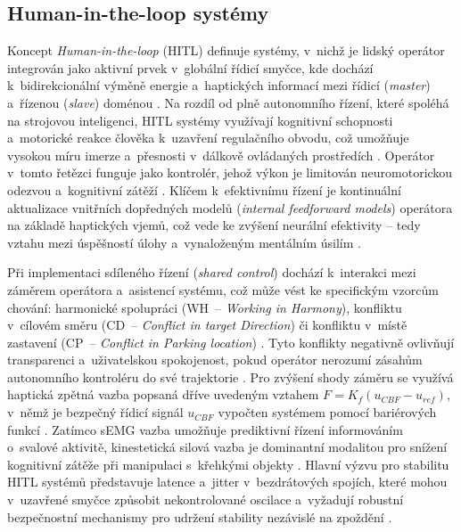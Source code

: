 \documentclass[FZS,DP]{tulthesis}
\begin{document}
\subsection{Human-in-the-loop systémy}
Koncept \textit{Human-in-the-loop} (HITL) definuje systémy, v~nichž je lidský operátor integrován jako aktivní prvek v~globální řídicí smyčce, kde dochází k~bidirekcionální výměně energie a~haptických informací mezi řídicí (\textit{master}) a~řízenou (\textit{slave}) doménou \cite{Aijaz2018, Xiong2024}.
Na rozdíl od plně autonomního řízení, které spoléhá na strojovou inteligenci, HITL systémy využívají kognitivní schopnosti a~motorické reakce člověka k~uzavření regulačního obvodu, což umožňuje vysokou míru imerze a~přesnosti v~dálkově ovládaných prostředích \cite{Aijaz2018, Thomas2023110, Zhang2021530}.
Operátor v~tomto řetězci funguje jako kontrolér, jehož výkon je limitován neuromotorickou odezvou a~kognitivní zátěží \cite{Suman2025, Thomas2023110}.
Klíčem k~efektivnímu řízení je kontinuální aktualizace vnitřních dopředných modelů (\textit{internal feedforward models}) operátora na základě haptických vjemů, což vede ke zvýšení neurální efektivity -- tedy vztahu mezi úspěšností úlohy a~vynaloženým mentálním úsilím \cite{Thomas2023110, GIUDICI2025}.

Při implementaci sdíleného řízení (\textit{shared control}) dochází k~interakci mezi záměrem operátora a~asistencí systému, což může vést ke specifickým vzorcům chování: harmonické spolupráci (WH~-- \textit{Working in Harmony}), konfliktu v~cílovém směru (CD~-- \textit{Conflict in target Direction}) či konfliktu v~místě zastavení (CP~-- \textit{Conflict in Parking location}) \cite{AlSaadi2023313}.
Tyto konflikty negativně ovlivňují transparenci a~uživatelskou spokojenost, pokud operátor nerozumí zásahům autonomního kontroléru do své trajektorie \cite{Zhang2021530}.
Pro zvýšení shody záměru se využívá haptická zpětná vazba popsaná dříve uvedeným vztahem $F = K_f \left(u_{CBF} - u_{ref}\right)$, v~němž je bezpečný řídicí signál $u_{CBF}$ vypočten systémem pomocí bariérových funkcí \cite{Zhang2021530}.
Zatímco sEMG vazba umožňuje prediktivní řízení informováním o~svalové aktivitě, kinestetická silová vazba je dominantní modalitou pro snížení kognitivní zátěže při manipulaci s~křehkými objekty \cite{Xiong2024, Thomas2023110, GIUDICI2025, Ninu2014}.
Hlavní výzvu pro stabilitu HITL systémů představuje latence a~jitter v~bezdrátových spojích, které mohou v~uzavřené smyčce způsobit nekontrolované oscilace a~vyžadují robustní bezpečnostní mechanismy pro udržení stability nezávislé na zpoždění \cite{Aijaz2018, Suman2025, GIUDICI2025, Black2025}.
\end{document}
